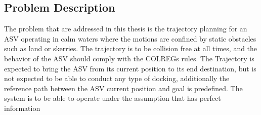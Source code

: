 \subsection{Problem Description}
The problem that are addressed in this thesis is the trajectory planning for an \gls{ASV} operating in calm waters
where the motions are confined by static obstacles such as land or skerries. The trajectory is to be collision
free at all times, and the behavior of the \gls{ASV} should comply with the COLREGs rules. The Trajectory is expected
to bring the \gls{ASV} from its current position to its end destination, but is not expected to be able to conduct
any type of docking, additionally the reference path between the \gls{ASV} current position and goal is predefined.
The system is to be able to operate under the assumption that has perfect information

